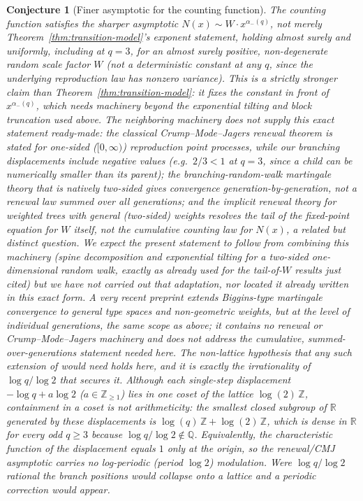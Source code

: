 \documentclass[11pt]{article}
\newtheorem{conjecture}[theorem]{Conjecture}
\theoremstyle{remark}
\begin{document}
\begin{conjecture}[Finer asymptotic for the counting function]\label{conj:transition-fine}
The counting function satisfies the sharper asymptotic
$N(x)\sim W\cdot x^{\alpha_-(q)}$, not merely
Theorem~\ref{thm:transition-model}'s exponent statement, holding almost
surely and uniformly, \emph{including} at $q=3$, for an almost surely
positive, non-degenerate random scale factor $W$ (not a deterministic
constant at any $q$, since the underlying reproduction law has nonzero
variance). This is a strictly stronger claim than
Theorem~\ref{thm:transition-model}: it fixes the constant in front
of $x^{\alpha_-(q)}$, which needs machinery
beyond the exponential tilting and block truncation used above. The
neighboring machinery does not supply this exact statement ready-made:
the classical Crump--Mode--Jagers renewal theorem
\cite{Nerman1981} is stated for one-sided ($[0,\infty)$) reproduction
point processes, while our branching displacements include negative
values (e.g.\ $2/3<1$ at $q=3$, since a child can be numerically
smaller than its parent); the branching-random-walk martingale theory
that is natively two-sided \cite{Biggins1992} gives convergence
generation-by-generation, not a renewal law summed over all generations;
and the implicit renewal theory for weighted trees with general
(two-sided) weights \cite{Goldie1991,JelenkovicOlveraCravioto2012,
AlsmeyerBigginsMeiners2012} resolves the \emph{tail} of the fixed-point
equation for $W$ itself, not the cumulative counting law for $N(x)$, a
related but distinct question. We expect the present statement to
follow from combining this machinery (spine decomposition and
exponential tilting for a two-sided one-dimensional random walk,
exactly as already used for the tail-of-$W$ results just cited) but we
have not carried out that adaptation, nor located it already written in
this exact form. A very recent preprint \cite{VillemonaisZalduendo2025}
extends Biggins-type martingale convergence to general type spaces and
non-geometric weights, but at the level of individual generations, the
same scope as \cite{Biggins1992} above; it contains no renewal or
Crump--Mode--Jagers machinery and does not address the cumulative,
summed-over-generations statement needed here. The non-lattice
hypothesis that any such extension of
\cite{Nerman1981} would need holds here, and it is exactly the
irrationality of $\log q/\log2$ that secures it. Although each
single-step displacement $-\log q + a\log2$ ($a\in\mathbb{Z}_{\ge1}$)
lies in one coset of the lattice $\log(2)\,\mathbb{Z}$, containment in
a coset is not arithmeticity: the smallest closed subgroup of
$\mathbb{R}$ generated by these displacements is
$\log(q)\,\mathbb{Z}+\log(2)\,\mathbb{Z}$, which is dense in
$\mathbb{R}$ for every odd $q\ge3$ because $\log q/\log2\notin\mathbb{Q}$.
Equivalently, the characteristic function of the displacement equals
$1$ only at the origin, so the renewal/CMJ asymptotic carries no
log-periodic (period $\log2$) modulation. Were $\log q/\log2$ rational
the branch positions would collapse onto a lattice and a
periodic correction would appear.
\end{conjecture}
\end{document}
